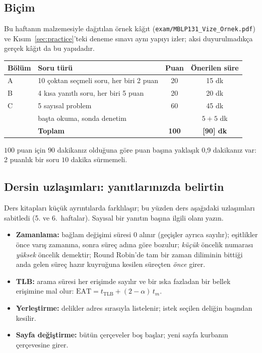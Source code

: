 \subsection{Biçim}
Bu haftanın malzemesiyle dağıtılan örnek kâğıt (\texttt{exam/MBLP131\_Vize\_Ornek.pdf}) ve Kısım~\ref{sec:practice}'teki deneme sınavı aynı yapıyı izler; aksi duyurulmadıkça gerçek kâğıt da bu yapıdadır.
\begin{center}
\renewcommand{\arraystretch}{1.25}
\begin{tabular}{@{}llcc@{}}
\toprule
\textbf{Bölüm} & \textbf{Soru türü} & \textbf{Puan} & \textbf{Önerilen süre} \\
\midrule
A & 10 çoktan seçmeli soru, her biri 2 puan & 20 & 15 dk \\
B & 4 kısa yanıtlı soru, her biri 5 puan & 20 & 20 dk \\
C & 5 sayısal problem & 60 & 45 dk \\
 & başta okuma, sonda denetim & & $5 + 5$ dk \\
\midrule
 & \textbf{Toplam} & \textbf{100} & \textbf{[90] dk} \\
\bottomrule
\end{tabular}
\end{center}
$100$ puan için $90$ dakikanız olduğuna göre puan başına yaklaşık 0,9 dakikanız var: 2 puanlık bir soru $10$ dakika sürmemeli.

\subsection{Dersin uzlaşımları: yanıtlarınızda belirtin}
Ders kitapları küçük ayrıntılarda farklılaşır; bu yüzden ders aşağıdaki uzlaşımları sabitledi (5. ve 6.~haftalar). Sayısal bir yanıtın başına ilgili olanı yazın.
\begin{keyidea}
\begin{itemize}[leftmargin=1.2em]
  \item \textbf{Zamanlama:} bağlam değişimi süresi $0$ alınır (geçişler ayrıca sayılır); eşitlikler önce varış zamanına, sonra süreç adına göre bozulur; \emph{küçük} öncelik numarası \emph{yüksek} öncelik demektir; Round Robin'de tam bir zaman diliminin bittiği anda gelen süreç hazır kuyruğuna kesilen süreçten \emph{önce} girer.
  \item \textbf{TLB:} arama süresi her erişimde sayılır ve bir ıska fazladan bir bellek erişimine mal olur: $\text{EAT} = t_{\text{TLB}} + (2-\alpha)\,t_m$.
  \item \textbf{Yerleştirme:} delikler adres sırasıyla listelenir; istek seçilen deliğin başından kesilir.
  \item \textbf{Sayfa değiştirme:} bütün çerçeveler boş başlar; yeni sayfa kurbanın çerçevesine girer.
\end{itemize}
\end{keyidea}

